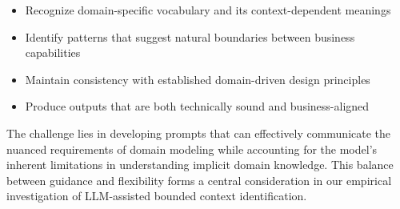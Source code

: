 \begin{itemize}
    \item Recognize domain-specific vocabulary and its context-dependent meanings
    \item Identify patterns that suggest natural boundaries between business capabilities
    \item Maintain consistency with established domain-driven design principles
    \item Produce outputs that are both technically sound and business-aligned
\end{itemize}

The challenge lies in developing prompts that can effectively communicate the nuanced requirements of domain modeling while accounting for the model's inherent limitations in understanding implicit domain knowledge. This balance between guidance and flexibility forms a central consideration in our empirical investigation of LLM-assisted bounded context identification.
